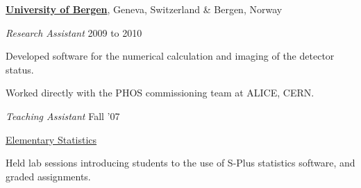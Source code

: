\documentclass[11pt]{article}
\newenvironment{outerlist}[1][\enskip\textbullet]%
        {\begin{itemize}[#1]}{\end{itemize}%
         \vspace{-.6\baselineskip}}
\newenvironment{innerlist}[1][\enskip\textbullet]%
        {\begin{compactitem}[#1]}{\end{compactitem}}
\newcommand{\blankline}{\quad\pagebreak[2]}
\begin{document}
\href{http://www.uib.no/en}{\textbf{University of Bergen}}, 
Geneva, Switzerland \& Bergen, Norway
\begin{outerlist}
\item[] \textit{Research Assistant}
  \hfill 2009 to 2010
  \begin{innerlist}
    \footnotesize
  \item Developed software for the numerical calculation and imaging of 
    the detector status.
  \item Worked directly with the PHOS commissioning team at ALICE, CERN.
  \end{innerlist}
\item[] \textit{Teaching Assistant}
  \hfill Fall '07
  \begin{innerlist}
    \footnotesize
  \item \href{http://www.uib.no/course/STAT101#course}{Elementary Statistics}
  \item Held lab sessions introducing students to the use of S-Plus statistics 
    software, and graded assignments.
  \end{innerlist}
\end{outerlist}

\blankline


\end{document}

